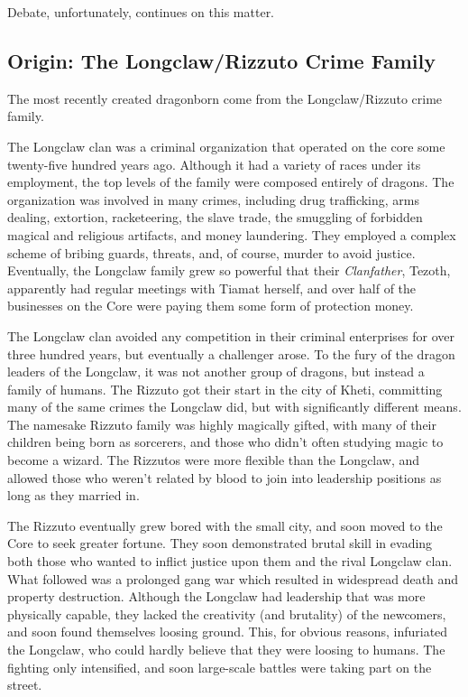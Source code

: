 Debate, unfortunately, continues on this matter.

\subsection{Origin: The Longclaw/Rizzuto Crime Family}
The most recently created dragonborn come from the Longclaw/Rizzuto crime family.

The Longclaw clan was a criminal organization that operated on the core some twenty-five hundred years ago.
Although it had a variety of races under its employment, the top levels of the family were composed entirely of dragons.
The organization was involved in many crimes, including drug trafficking, arms dealing, extortion, racketeering, the slave trade, the smuggling of forbidden magical and religious artifacts, and money laundering.
They employed a complex scheme of bribing guards, threats, and, of course, murder to avoid justice.
Eventually, the Longclaw family grew so powerful that their \textit{Clanfather}, Tezoth, apparently had regular meetings with Tiamat herself, and over half of the businesses on the Core were paying them some form of protection money.

The Longclaw clan avoided any competition in their criminal enterprises for over three hundred years, but eventually a challenger arose.
To the fury of the dragon leaders of the Longclaw, it was not another group of dragons, but instead a family of humans.
The Rizzuto got their start in the city of Kheti, committing many of the same crimes the Longclaw did, but with significantly different means.
The namesake Rizzuto family was highly magically gifted, with many of their children being born as sorcerers, and those who didn't often studying magic to become a wizard.
The Rizzutos were more flexible than the Longclaw, and allowed those who weren't related by blood to join into leadership positions as long as they married in.

The Rizzuto eventually grew bored with the small city, and soon moved to the Core to seek greater fortune.
They soon demonstrated brutal skill in evading both those who wanted to inflict justice upon them and the rival Longclaw clan.
What followed was a prolonged gang war which resulted in widespread death and property destruction.
Although the Longclaw had leadership that was more physically capable, they lacked the creativity (and brutality) of the newcomers, and soon found themselves loosing ground.
This, for obvious reasons, infuriated the Longclaw, who could hardly believe that they were loosing to humans.
The fighting only intensified, and soon large-scale battles were taking part on the street.

